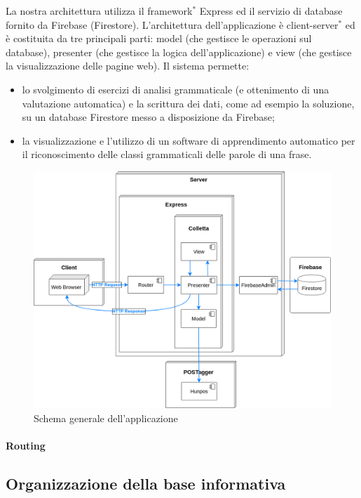 La nostra architettura utilizza il framework$^{*}$ Express ed il servizio di database fornito da Firebase (Firestore). L'architettura dell'applicazione è client-server$^{*}$ ed è costituita da tre principali parti: model (che gestisce le operazioni sul database), presenter (che gestisce la logica dell'applicazione) e view (che gestisce la visualizzazione delle pagine web). Il sistema permette:
\begin{itemize}
	\item lo svolgimento di esercizi di analisi grammaticale (e ottenimento di una valutazione automatica) e la scrittura dei dati, come ad esempio la soluzione, su un database Firestore messo a disposizione da Firebase;
	\item la visualizzazione e l'utilizzo di un software di apprendimento automatico per il riconoscimento delle classi grammaticali delle parole di una frase.
\end{itemize}

\begin{figure}[h]
	\includegraphics[scale=0.4]{images/architettura.png}
	\caption{Schema generale dell'applicazione}
\end{figure}

\paragraph*{Routing\\}

\newpage

\subsection{Organizzazione della base informativa}

\newpage

